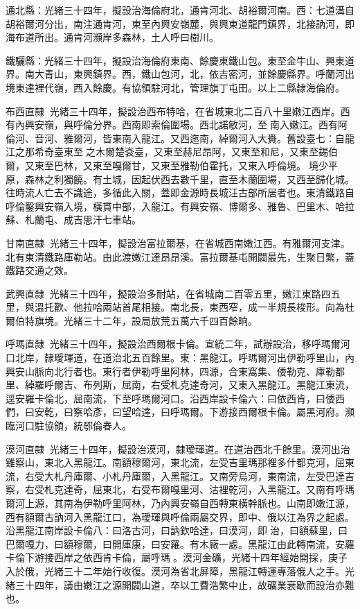 \begin{pinyinscope}
通北縣：光緒三十四年，擬設治海倫府北，通肯河北、胡裕爾河南。西：七道溝自胡裕爾河分出，南注通肯河，東至內興安嶺麓，與興東道龍門鎮界，北接訥河，即海布道所出。通肯河瀕岸多森林，土人呼曰樹川。

鐵驪縣：光緒三十四年，擬設治海倫府東南、餘慶東鐵山包。東至金牛山、興東道界。南大青山，東興鎮界。西，鐵山包河，北，依吉密河，並餘慶縣界。呼蘭河出境東達裡代嶺，西入餘慶。有協領駐河北，管理旗丁屯田。以上二縣隸海倫府。

布西直隸：光緒三十四年，擬設治西布特哈，在省城東北二百八十里嫩江西岸。西有內興安嶺，與呼倫分界。西南即索倫圍場。西北諾敏河，至南入嫩江。西有阿倫河、音河、雅爾河，皆東南入龍江。又西迤南，綽爾河入大賚。舊設臺七：自龍江之那希奇臺東至之木爾楚袞臺，又東至赫尼昂阿，又東至和尼，又東至錫伯爾，又東至巴林，又東至嘎爾甘，又東至雅勒伯霍托，又東入呼倫境。境少平原，森林之利獨饒。有土城，因起伏西去數千里，直至木蘭圍場，又西至歸化城。往時流人亡去不識途，多循此入關，蓋即金源時長城汪古部所居者也。東清鐵路自呼倫鑿興安嶺入境，橫貫中部，入龍江。有興安嶺、博爾多、雅魯、巴里木、哈拉蘇、札蘭屯、成吉思汗七車站。

甘南直隸：光緒三十四年，擬設治富拉爾基，在省城西南嫩江西。有雅爾河支津。北有東清鐵路庫勒站。由此渡嫩江達昂昂溪。富拉爾基屯開闢最先，生聚日繁，蓋鐵路交通之效。

武興直隸：光緒三十四年，擬設治多耐站，在省城南二百零五里，嫩江東路四五里，與溫托歡、他拉哈兩站首尾相接。南北長，東西窄，成一半規長梭形。向為杜爾伯特旗境。光緒三十二年，設局放荒五萬六千四百餘晌。

呼瑪直隸：光緒三十四年，擬設治西爾根卡倫。宣統二年，試辦設治，移呼瑪爾河口北岸，隸璦琿道，在道治北五百餘里。東：黑龍江。呼瑪爾河出伊勒呼里山，內興安山脈向北行者也。東行者伊勒呼里阿林，四源，合東窩集、倭勒克、庫勒都里、綽羅呼爾吉、布列斯，屈南，右受札克達奇河，又東入黑龍江。黑龍江東流，逕安羅卡倫北，屈南流，下至呼瑪爾河口。沿西岸設卡倫六：曰依西肯，曰倭西們，曰安乾，曰察哈彥，曰望哈達，曰呼瑪爾。下游接西爾根卡倫。屬黑河府。瀕臨河口駐協領，統鄂倫春人。

漠河直隸：光緒三十四年，擬設治漠河，隸璦琿道。在道治西北千餘里。漠河出治雞察山，東北入黑龍江。南額穆爾河，東北流，左受吉里瑪那裡多什都克河，屈東流，右受大札丹庫爾、小札丹庫爾，入黑龍江。又南旁烏河，東南流，左受巴達吉察，右受札克達奇，屈東北，右受布爾嘎里河、沽裡乾河，入黑龍江。又南有呼瑪爾河上源，其南為伊勒呼里阿林，乃內興安嶺自西轉東橫幹脈也。山南即嫩江源，西有額爾古訥河入黑龍江口，為璦琿與呼倫兩屬交界，即中、俄以江為界之起處。沿黑龍江南岸設卡倫八：曰洛古河，曰訥欽哈達，曰漠河，即治，曰額蘇里，曰巴爾嘎力，曰額穆爾，曰開庫康，曰安羅。有木廠一處。黑龍江由此轉南流，安羅卡倫下游接西岸之依西肯卡倫，屬呼瑪。漠河金礦，光緒十四年經始開採，庚子入於俄，光緒三十二年始行收復。漠河為省北屏障，黑龍江轉運專落俄人之手。光緒三十四年，議由嫩江之源開闢山道，卒以工費浩繁中止，故礦業衰歇而設治亦難也。


\end{pinyinscope}
